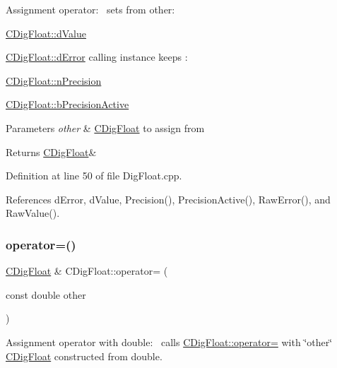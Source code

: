 Assignment operator\+:~\newline
 sets from other\+: 


\begin{DoxyItemize}
\item \hyperlink{classCDigFloat_a4bbe69e30dd4e20527362493aa9aaf96}{C\+Dig\+Float\+::d\+Value}
\item \hyperlink{classCDigFloat_a25eb3782d1e727ff007a48f8308e3d4d}{C\+Dig\+Float\+::d\+Error} calling instance keeps \+:
\item \hyperlink{classCDigFloat_ad580654be35246d14c91482581c0bc11}{C\+Dig\+Float\+::n\+Precision}
\item \hyperlink{classCDigFloat_aa1f6ed0312a2aa6ae5ee2abd195adefc}{C\+Dig\+Float\+::b\+Precision\+Active}
\end{DoxyItemize}


\begin{DoxyParams}{Parameters}
{\em other} & \hyperlink{classCDigFloat}{C\+Dig\+Float} to assign from \\
\hline
\end{DoxyParams}
\begin{DoxyReturn}{Returns}
\hyperlink{classCDigFloat}{C\+Dig\+Float}\& 
\end{DoxyReturn}


Definition at line 50 of file Dig\+Float.\+cpp.



References d\+Error, d\+Value, Precision(), Precision\+Active(), Raw\+Error(), and Raw\+Value().

\mbox{\label{classCDigFloat_a6113b805767862e3e98fac9a3e10c7cd}} 
\subsubsection{\texorpdfstring{operator=()}{operator=()}\hspace{0.1cm}{\footnotesize\ttfamily [2/2]}}
{\footnotesize\ttfamily \hyperlink{classCDigFloat}{C\+Dig\+Float} \& C\+Dig\+Float\+::operator= (\begin{DoxyParamCaption}\item[{const double}]{other }\end{DoxyParamCaption})}



Assignment operator with double\+:~\newline
 calls \hyperlink{classCDigFloat_a74f36566c2c79d7258b7b2dee35d46b2}{C\+Dig\+Float\+::operator=} with \char`\"{}other\char`\"{} \hyperlink{classCDigFloat}{C\+Dig\+Float} constructed from double. 



